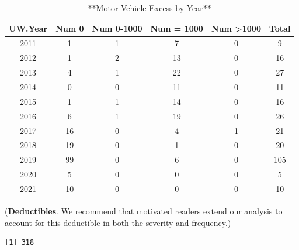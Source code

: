 \documentclass[
]{book}
\newenvironment{Shaded}{\begin{snugshade}}{\end{snugshade}}
\newcommand{\AttributeTok}[1]{\textcolor[rgb]{0.77,0.63,0.00}{#1}}
\newcommand{\CommentTok}[1]{\textcolor[rgb]{0.56,0.35,0.01}{\textit{#1}}}
\newcommand{\DecValTok}[1]{\textcolor[rgb]{0.00,0.00,0.81}{#1}}
\newcommand{\FunctionTok}[1]{\textcolor[rgb]{0.00,0.00,0.00}{#1}}
\newcommand{\NormalTok}[1]{#1}
\newcommand{\OtherTok}[1]{\textcolor[rgb]{0.56,0.35,0.01}{#1}}
\newcommand{\SpecialCharTok}[1]{\textcolor[rgb]{0.00,0.00,0.00}{#1}}
\newcommand{\StringTok}[1]{\textcolor[rgb]{0.31,0.60,0.02}{#1}}
\begin{document}
\begin{table}

\caption{\label{tab:TableExcess}**Motor Vehicle Excess by Year**}
\centering
\begin{tabular}[t]{c|c|c|c|c|c}
\hline
UW.Year & Num 0 & Num 0-1000 & Num = 1000 & Num >1000 & Total\\
\hline
2011 & 1 & 1 & 7 & 0 & 9\\
\hline
2012 & 1 & 2 & 13 & 0 & 16\\
\hline
2013 & 4 & 1 & 22 & 0 & 27\\
\hline
2014 & 0 & 0 & 11 & 0 & 11\\
\hline
2015 & 1 & 1 & 14 & 0 & 16\\
\hline
2016 & 6 & 1 & 19 & 0 & 26\\
\hline
2017 & 16 & 0 & 4 & 1 & 21\\
\hline
2018 & 19 & 0 & 1 & 0 & 20\\
\hline
2019 & 99 & 0 & 6 & 0 & 105\\
\hline
2020 & 5 & 0 & 0 & 0 & 5\\
\hline
2021 & 10 & 0 & 0 & 0 & 10\\
\hline
\end{tabular}
\end{table}

(\textbf{Deductibles}. We recommend that motivated readers extend our analysis to account for this deductible in both the severity and frequency.)

\begin{Shaded}
\end{Shaded}

\begin{verbatim}
[1] 318
\end{verbatim}

\begin{Shaded}
\end{Shaded}
\end{document}
